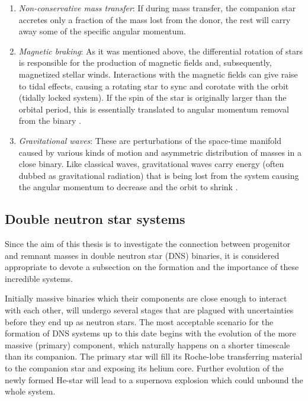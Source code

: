 \documentclass[../../main/thesis_msc.tex]{subfiles}
\begin{document}
				\begin{enumerate}[label=(\roman*)]
				
					\item \emph{Non-conservative mass transfer}: If during mass transfer, the companion star accretes only a fraction of the mass lost from the donor, the rest will carry away some of the specific angular momentum.
					\item \emph{Magnetic braking}: As it was mentioned above, the differential rotation of stars is responsible for the production of magnetic fields and, subsequently, magnetized stellar winds. Interactions with the magnetic fields can give raise to tidal effects, causing a rotating star to sync and corotate with the orbit (tidally locked system). If the spin of the star is originally larger than the orbital period, this is essentially translated to angular momentum removal from the binary \citep[see also][]{Rappaport1983}.
					\item \emph{Gravitational waves}:  These are perturbations of the space-time manifold caused by various kinds of motion and asymmetric distribution of masses in a close binary. Like classical waves, gravitational waves carry energy (often dubbed as gravitational radiation) that is being lost from the system causing the angular momentum to decrease and the orbit to shrink \citep[see also][]{Peters1964, Riles2013}.
				
				\end{enumerate}
				
				
			\subsection{Double neutron star systems}
			
				Since the aim of this thesis is to investigate the connection between progenitor and remnant masses in double neutron star (DNS) binaries, it is considered appropriate to devote a subsection on the formation and the importance of these incredible systems.
				
				Initially massive binaries which their components are close enough to interact with each other, will undergo several stages that are plagued with uncertainties before they end up as neutron stars. The most acceptable scenario for the formation of DNS systems up to this date begins with the evolution of the more massive (primary) component, which naturally happens on a shorter timescale than its companion. The primary star will fill its Roche-lobe transferring material to the companion star and exposing its helium core. Further evolution of the newly formed He-star will lead to a supernova explosion which could unbound the whole system. 
				
\end{document}
